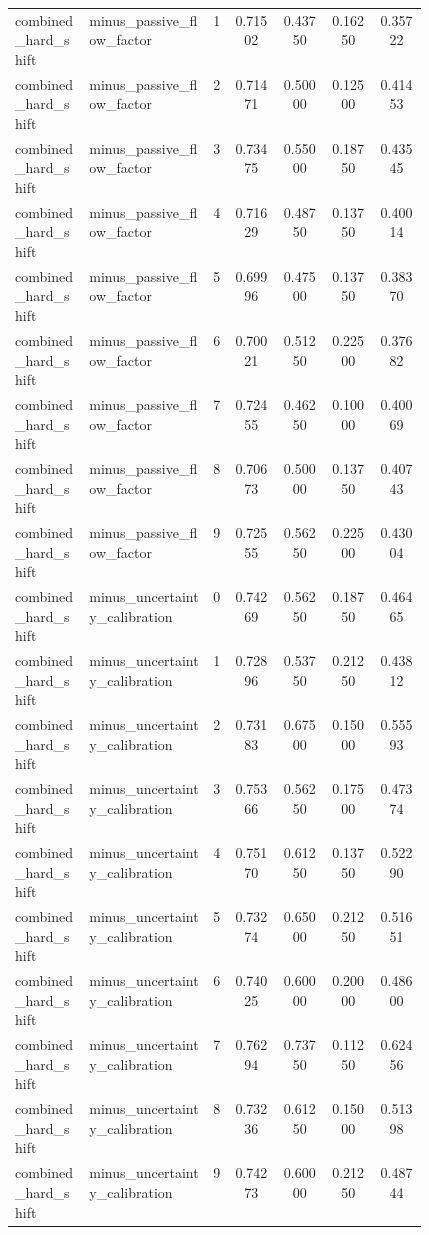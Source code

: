 \documentclass{article}
\begin{document}
\begin{center}
\begin{longtable}{p{0.18\linewidth}p{0.30\linewidth}ccccc}
combined\_hard\_shift & minus\_passive\_flow\_factor & 1 & 0.71502 & 0.43750 & 0.16250 & 0.35722\\
combined\_hard\_shift & minus\_passive\_flow\_factor & 2 & 0.71471 & 0.50000 & 0.12500 & 0.41453\\
combined\_hard\_shift & minus\_passive\_flow\_factor & 3 & 0.73475 & 0.55000 & 0.18750 & 0.43545\\
combined\_hard\_shift & minus\_passive\_flow\_factor & 4 & 0.71629 & 0.48750 & 0.13750 & 0.40014\\
combined\_hard\_shift & minus\_passive\_flow\_factor & 5 & 0.69996 & 0.47500 & 0.13750 & 0.38370\\
combined\_hard\_shift & minus\_passive\_flow\_factor & 6 & 0.70021 & 0.51250 & 0.22500 & 0.37682\\
combined\_hard\_shift & minus\_passive\_flow\_factor & 7 & 0.72455 & 0.46250 & 0.10000 & 0.40069\\
combined\_hard\_shift & minus\_passive\_flow\_factor & 8 & 0.70673 & 0.50000 & 0.13750 & 0.40743\\
combined\_hard\_shift & minus\_passive\_flow\_factor & 9 & 0.72555 & 0.56250 & 0.22500 & 0.43004\\
combined\_hard\_shift & minus\_uncertainty\_calibration & 0 & 0.74269 & 0.56250 & 0.18750 & 0.46465\\
combined\_hard\_shift & minus\_uncertainty\_calibration & 1 & 0.72896 & 0.53750 & 0.21250 & 0.43812\\
combined\_hard\_shift & minus\_uncertainty\_calibration & 2 & 0.73183 & 0.67500 & 0.15000 & 0.55593\\
combined\_hard\_shift & minus\_uncertainty\_calibration & 3 & 0.75366 & 0.56250 & 0.17500 & 0.47374\\
combined\_hard\_shift & minus\_uncertainty\_calibration & 4 & 0.75170 & 0.61250 & 0.13750 & 0.52290\\
combined\_hard\_shift & minus\_uncertainty\_calibration & 5 & 0.73274 & 0.65000 & 0.21250 & 0.51651\\
combined\_hard\_shift & minus\_uncertainty\_calibration & 6 & 0.74025 & 0.60000 & 0.20000 & 0.48600\\
combined\_hard\_shift & minus\_uncertainty\_calibration & 7 & 0.76294 & 0.73750 & 0.11250 & 0.62456\\
combined\_hard\_shift & minus\_uncertainty\_calibration & 8 & 0.73236 & 0.61250 & 0.15000 & 0.51398\\
combined\_hard\_shift & minus\_uncertainty\_calibration & 9 & 0.74273 & 0.60000 & 0.21250 & 0.48744\\

\end{longtable}
\end{center}
\end{document}
